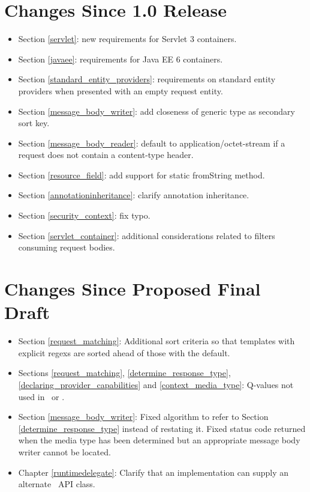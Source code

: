 \section{Changes Since 1.0 Release}

\begin{itemize}
\item Section \ref{servlet}: new requirements for Servlet 3 containers.
\item Section \ref{javaee}: requirements for Java EE 6 containers.
\item Section \ref{standard_entity_providers}: requirements on standard entity providers when presented with an empty request entity.
\item Section \ref{message_body_writer}: add closeness of generic type as secondary sort key.
\item Section \ref{message_body_reader}: default to application/octet-stream if a request does not contain a content-type header.
\item Section \ref{resource_field}: add support for static fromString method.
\item Section \ref{annotationinheritance}: clarify annotation inheritance.
\item Section \ref{security_context}: fix typo.
\item Section \ref{servlet_container}: additional considerations related to filters consuming request bodies.
\end{itemize}

\section{Changes Since Proposed Final Draft}

\begin{itemize}
\item Section \ref{request_matching}: Additional sort criteria so that templates with explicit regexs are sorted ahead of those with the default.
\item Sections \ref{request_matching}, \ref{determine_response_type}, \ref{declaring_provider_capabilities} and \ref{context_media_type}: Q-values not used in \Consumes\ or \Produces.
\item Section \ref{message_body_writer}: Fixed algorithm to refer to Section \ref{determine_response_type} instead of restating it. Fixed status code returned when the media type has been determined but an appropriate message body writer cannot be located.
\item Chapter \ref{runtimedelegate}: Clarify that an implementation can supply an alternate \rd\ API class.
\end{itemize}

